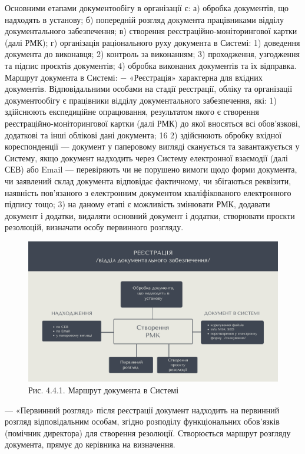 Основними етапами документообігу в організації є:
а) обробка документів, що надходять в установу;
б) попередній розгляд документа працівниками відділу документального
забезпечення;
в) створення реєстраційно-моніторингової картки (далі РМК);
г) організація раціонального руху документа в Системі:
1) доведення документа до виконавця;
2) контроль за виконанням;
3) проходження, узгодження та підпис проєктів документів;
4) обробка виконаних документів та їх відправка.
Маршрут документа в Системі:
− «Реєстрація» характерна для вхідних документів. Відповідальними
особами на стадії реєстрації, обліку та організації документообігу є
працівники відділу документального забезпечення, які:
1) здійснюють експедиційне опрацювання, результатом якого є створення
реєстраційно-моніторингової картки (далі РМК) до якої вносяться всі
обов’язкові, додаткові та інші облікові дані документа;
16
2) здійснюють обробку вхідної кореспонденції --- документ у паперовому
вигляді сканується та завантажується у Систему, якщо документ надходить
через Систему електронної взаємодії (далі СЕВ) або Email --- перевіряють чи
не порушено вимоги щодо форми документа, чи заявлений склад документа
відповідає фактичному, чи збігаються реквізити, наявність пов’язаного з
електронним документом кваліфікованого електронного підпису тощо;
3) на даному етапі є можливість змінювати РМК, додавати документ і додатки,
видаляти основний документ і додатки, створювати проєкти резолюцій,
визначати особу первинного розгляду.

\begin{figure}[!htbp]
\centerline{\includegraphics[width=\textwidth]{img/4.4.1.png}}
\caption{Рис. 4.4.1. Маршрут документа в Системі}
\end{figure}

--- «Первинний розгляд» після реєстрації документ надходить на первинний
розгляд відповідальним особам, згідно розподілу функціональних
обов’язків (помічник директора) для створення резолюції. Створюється
маршрут розгляду документа, прямує до керівника на визначення.


